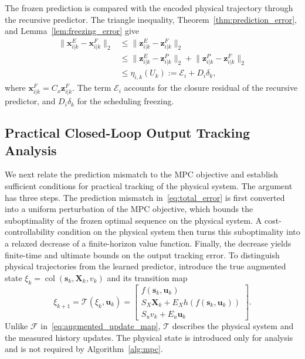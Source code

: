 \documentclass[journal]{IEEEtran}
\newcommand{\vx}{\mathbf{x}}
\newcommand{\vu}{\mathbf{u}}
\newcommand{\vs}{\mathbf{s}}
\newcommand{\vz}{\mathbf{z}}
\newcommand{\mX}{\mathbf{X}}
\newcommand{\norm}[2][]{\mathopen{#1\lVert}#2\mathclose{#1\rVert}}
\newcommand{\col}{\operatorname{col}}
\theoremstyle{plain}
\theoremstyle{definition}
\theoremstyle{definition}
\begin{document}
The frozen prediction is compared with the encoded physical
trajectory through the recursive predictor. The triangle inequality,
Theorem~\ref{thm:prediction_error}, and
Lemma~\ref{lem:freezing_error} give
\begin{equation}
\begin{aligned}
\norm{\vx_{i|k}^E-\vx_{i|k}^F}_2
&\le\norm{\vz_{i|k}^E-\vz_{i|k}^F}_2\\
&\le\norm{\vz_{i|k}^E-\vz_{i|k}^P}_2
+\norm{\vz_{i|k}^P-\vz_{i|k}^F}_2\\
&\le\eta_{i,k}(U_k):=\mathcal E_i+D_i\delta_k,
\end{aligned}
\label{eq:total_error}
\end{equation}
where $\vx_{i|k}^F=C_x\vz_{i|k}^F$. The term $\mathcal E_i$ accounts for the
closure residual of the recursive predictor, and $D_i\delta_k$ for the
scheduling freezing.

\subsection{Practical Closed-Loop Output Tracking Analysis}
\label{sec:closed_loop_stability}

We next relate the prediction mismatch to the MPC objective and
establish sufficient conditions for practical tracking of the physical
system. The argument has three steps. The prediction mismatch
in~\eqref{eq:total_error} is first converted into a uniform
perturbation of the MPC objective, which bounds the suboptimality of
the frozen optimal sequence on the physical system. A
cost-controllability condition on the physical system then turns this
suboptimality into a relaxed decrease of a finite-horizon value
function. Finally, the decrease yields finite-time and ultimate bounds
on the output tracking error. To distinguish physical trajectories
from the learned
predictor, introduce the true augmented state
$\xi_k=\col(\vs_k,\mX_k,v_k)$ and its transition map
\begin{equation}
\xi_{k+1}=\mathcal T(\xi_k,\vu_k)
=\begin{bmatrix}
f(\vs_k,\vu_k)\\
S_X\mX_k+E_Xh(f(\vs_k,\vu_k))\\
S_uv_k+E_u\vu_k
\end{bmatrix}.
\label{eq:true_augmented_transition}
\end{equation}
Unlike $\mathcal F$ in~\eqref{eq:augmented_update_map},
$\mathcal T$ describes the physical system and the measured history
updates. The physical state is introduced only for analysis and is
not required by Algorithm~\ref{alg:mpc}.
\end{document}
